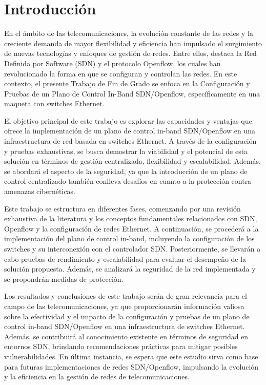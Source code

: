 \documentclass[a4paper, 12pt]{book}
\begin{document}
	
	
	\clearpage
	\chapter{Introducción}
	\label{sec:intro} %
	
	
	En el ámbito de las telecomunicaciones, la evolución constante de las redes y la creciente demanda de mayor flexibilidad y eficiencia han impulsado el surgimiento de nuevas tecnologías y enfoques de gestión de redes. Entre ellos, destaca la Red Definida por Software (SDN) y el protocolo Openflow, los cuales han revolucionado la forma en que se configuran y controlan las redes. En este contexto, el presente Trabajo de Fin de Grado se enfoca en la Configuración y Pruebas de un Plano de Control In-Band SDN/Openflow, específicamente en una maqueta con switches Ethernet.
	
	El objetivo principal de este trabajo es explorar las capacidades y ventajas que ofrece la implementación de un plano de control in-band SDN/Openflow en una infraestructura de red basada en switches Ethernet. A través de la configuración y pruebas exhaustivas, se busca demostrar la viabilidad y el potencial de esta solución en términos de gestión centralizada, flexibilidad y escalabilidad. Además, se abordará el aspecto de la seguridad, ya que la introducción de un plano de control centralizado también conlleva desafíos en cuanto a la protección contra amenazas cibernéticas.
	
	Este trabajo se estructura en diferentes fases, comenzando por una revisión exhaustiva de la literatura y los conceptos fundamentales relacionados con SDN, Openflow y la configuración de redes Ethernet. A continuación, se procederá a la implementación del plano de control in-band, incluyendo la configuración de los switches y su interconexión con el controlador SDN. Posteriormente, se llevarán a cabo pruebas de rendimiento y escalabilidad para evaluar el desempeño de la solución propuesta. Además, se analizará la seguridad de la red implementada y se propondrán medidas de protección.
	
	Los resultados y conclusiones de este trabajo serán de gran relevancia para el campo de las telecomunicaciones, ya que proporcionarán información valiosa sobre la efectividad y el impacto de la configuración y pruebas de un plano de control in-band SDN/Openflow en una infraestructura de switches Ethernet. Además, se contribuirá al conocimiento existente en términos de seguridad en entornos SDN, brindando recomendaciones prácticas para mitigar posibles vulnerabilidades. En última instancia, se espera que este estudio sirva como base para futuras implementaciones de redes SDN/Openflow, impulsando la evolución y la eficiencia en la gestión de redes de telecomunicaciones.
	
\end{document}
